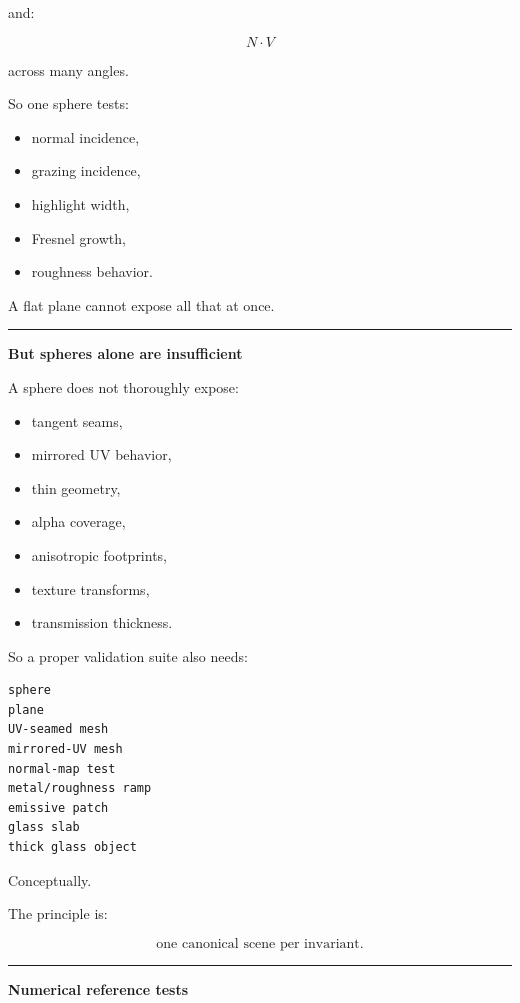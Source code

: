 and:

\[
N\cdot V
\]

across many angles.

So one sphere tests:

\begin{itemize}
\tightlist
\item
  normal incidence,
\item
  grazing incidence,
\item
  highlight width,
\item
  Fresnel growth,
\item
  roughness behavior.
\end{itemize}

A flat plane cannot expose all that at once.

\begin{center}\rule{0.5\linewidth}{0.5pt}\end{center}

\textbf{But spheres alone are insufficient}

A sphere does not thoroughly expose:

\begin{itemize}
\tightlist
\item
  tangent seams,
\item
  mirrored UV behavior,
\item
  thin geometry,
\item
  alpha coverage,
\item
  anisotropic footprints,
\item
  texture transforms,
\item
  transmission thickness.
\end{itemize}

So a proper validation suite also needs:

\begin{verbatim}
sphere
plane
UV-seamed mesh
mirrored-UV mesh
normal-map test
metal/roughness ramp
emissive patch
glass slab
thick glass object
\end{verbatim}

Conceptually.

The principle is:

\[
\boxed{
\text{one canonical scene per invariant}.
}
\]

\begin{center}\rule{0.5\linewidth}{0.5pt}\end{center}

\textbf{Numerical reference tests}

